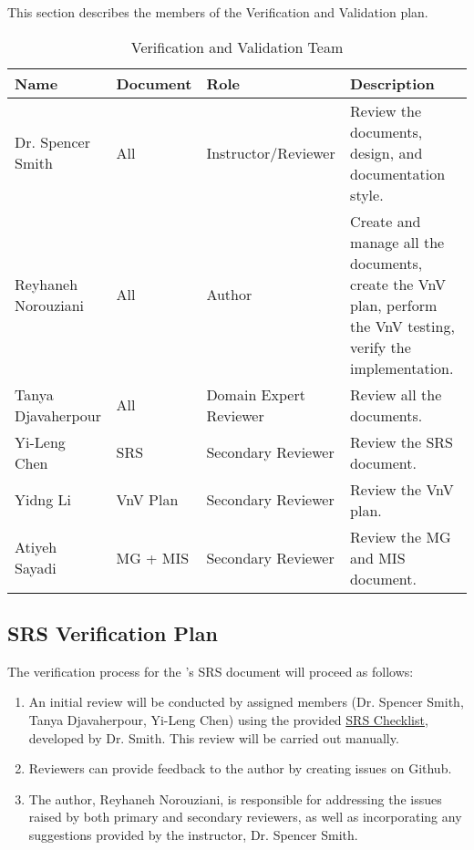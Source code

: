 \documentclass[12pt, titlepage]{article}
\begin{document}
This section describes the members of the Verification and Validation plan.

\begin{table}[h!]

  \vspace*{3mm}
  \begin{tabular}{|p{}|p{}|p{}|p{}|}
  \hline
  \textbf{Name} & \textbf{Document} & \textbf{Role} & \textbf{Description} \\
  \hline
  Dr. Spencer Smith & All & Instructor/Reviewer & Review the documents, design, and documentation style. \\ 
  \hline
  Reyhaneh Norouziani & All & Author & Create and manage all the documents, create the VnV plan, perform the VnV testing, verify the implementation. \\  
  \hline
  Tanya Djavaherpour & All & Domain Expert Reviewer & Review all the documents. \\  
  \hline
  Yi-Leng Chen & SRS & Secondary Reviewer & Review the SRS document. \\
  \hline
  Yidng Li & VnV Plan & Secondary Reviewer & Review the VnV plan. \\ 
  \hline
  Atiyeh Sayadi & MG + MIS & Secondary Reviewer & Review the MG and MIS document. \\
  \hline 
  \end{tabular}
  \caption{Verification and Validation Team} \label{team}
\end{table}
\subsection{SRS Verification Plan}

The verification process for the \progname{}'s SRS document will proceed as follows:
\begin{enumerate}
    \item An initial review will be conducted by assigned members (Dr. Spencer Smith, Tanya Djavaherpour, Yi-Leng Chen) using the provided \href{https://github.com/smiths/capTemplate/blob/9251702fdcb9800c59f6ed3d11d91e2bd62fca6d/docs/Checklists/SRS-Checklist.pdf}{SRS Checklist}, developed by Dr. Smith. This review will be carried out manually.
    \item Reviewers can provide feedback to the author by creating issues on Github.
    \item The author, Reyhaneh Norouziani, is responsible for addressing the issues raised by both primary and secondary reviewers, as well as incorporating any suggestions provided by the instructor, Dr. Spencer Smith.
\end{enumerate}
\end{document}
